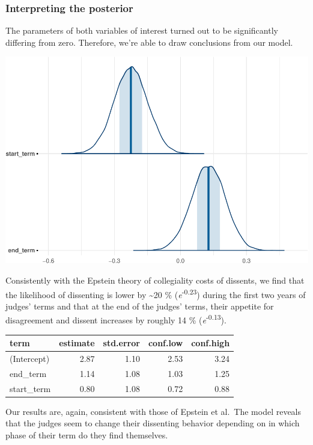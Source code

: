 \documentclass[
  11pt,
]{article}
\begin{document}
\hypertarget{interpreting-the-posterior-1}{%
\subsubsection{Interpreting the
posterior}\label{interpreting-the-posterior-1}}

The parameters of both variables of interest turned out to be
significantly differing from zero. Therefore, we're able to draw
conclusions from our model.

\includegraphics{dissents_article_files/figure-latex/interpreting_posterior_term2-1.pdf}

Consistently with the Epstein theory of collegiality costs of dissents,
we find that the likelihood of dissenting is lower by \textasciitilde20
\% (\emph{e}\textsuperscript{-0.23}) during the first two years of
judges' terms and that at the end of the judges' terms, their appetite
for disagreement and dissent increases by roughly 14 \%
(\emph{e}\textsuperscript{-0.13}).

\begin{longtable}[]{@{}lrrrr@{}}
\toprule\noalign{}
term & estimate & std.error & conf.low & conf.high \\
\midrule\noalign{}
\endhead
\bottomrule\noalign{}
\endlastfoot
(Intercept) & 2.87 & 1.10 & 2.53 & 3.24 \\
end\_term & 1.14 & 1.08 & 1.03 & 1.25 \\
start\_term & 0.80 & 1.08 & 0.72 & 0.88 \\
\end{longtable}

Our results are, again, consistent with those of Epstein et al.~The
model reveals that the judges seem to change their dissenting behavior
depending on in which phase of their term do they find themselves.
\end{document}
